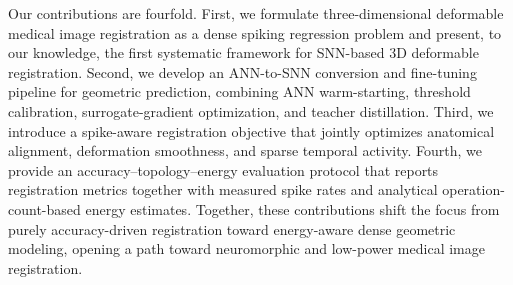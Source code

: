 Our contributions are fourfold. First, we formulate three-dimensional deformable medical image registration as a dense spiking regression problem and present, to our knowledge, the first systematic framework for SNN-based 3D deformable registration. Second, we develop an ANN-to-SNN conversion and fine-tuning pipeline for geometric prediction, combining ANN warm-starting, threshold calibration, surrogate-gradient optimization, and teacher distillation. Third, we introduce a spike-aware registration objective that jointly optimizes anatomical alignment, deformation smoothness, and sparse temporal activity. Fourth, we provide an accuracy--topology--energy evaluation protocol that reports registration metrics together with measured spike rates and analytical operation-count-based energy estimates. Together, these contributions shift the focus from purely accuracy-driven registration toward energy-aware dense geometric modeling, opening a path toward neuromorphic and low-power medical image registration.